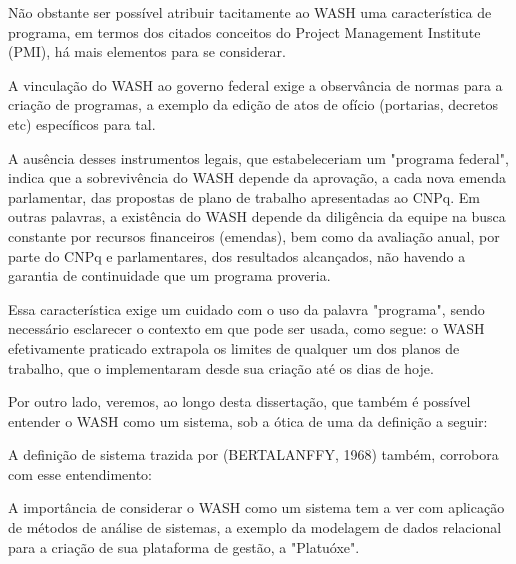 Não obstante ser possível atribuir tacitamente ao WASH uma característica de programa, em termos dos citados conceitos do Project Management Institute (PMI), há mais elementos para se considerar.

A vinculação do WASH ao governo federal exige a observância de normas para a criação de programas, a exemplo da edição de atos de ofício (portarias, decretos etc) específicos para tal.

A ausência desses instrumentos legais, que estabeleceriam um "programa federal", indica que a sobrevivência do WASH depende da aprovação, a cada nova emenda parlamentar, das propostas de plano de trabalho apresentadas ao CNPq. Em outras palavras, a existência do WASH depende da diligência da equipe na busca constante por recursos financeiros (emendas), bem como da avaliação anual, por parte do CNPq e parlamentares, dos resultados alcançados, não havendo a garantia de continuidade que um programa proveria.

Essa característica exige um cuidado com o uso da palavra "programa", sendo necessário esclarecer o contexto em que pode ser usada, como segue: o WASH efetivamente praticado extrapola os limites de qualquer um dos planos de trabalho, que o implementaram desde sua criação até os dias de hoje.

Por outro lado, veremos, ao longo desta dissertação, que também é possível entender o WASH como um sistema, sob a ótica de uma da definição a seguir:


\noindent\begin{center}\mbox{\centering{}}\end{center}


A definição de sistema trazida por (BERTALANFFY, 1968) também, corrobora com esse entendimento:


\noindent\begin{center}\mbox{\centering{}}\end{center}


A importância de considerar o WASH como um sistema tem a ver com aplicação de métodos de análise de sistemas, a exemplo da modelagem de dados relacional para a criação de sua plataforma de gestão, a "Platuóxe".

